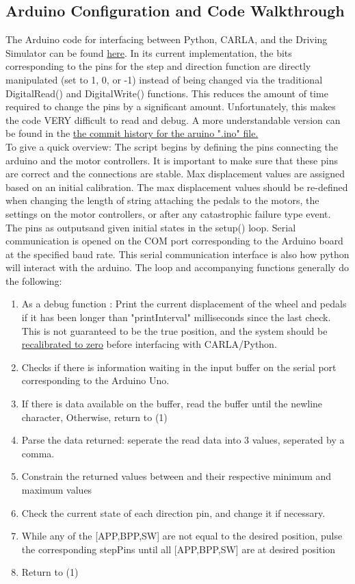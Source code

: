 \documentclass{article}
\begin{document}
\subsection{Arduino Configuration and Code Walkthrough}
The Arduino code for interfacing between Python, CARLA, and the Driving Simulator can be found \href{https://github.com/hrwhite21/DriverlessDIL/blob/main/PythonToMotor/PythonToMotor.ino}{here}. In its current implementation, the bits corresponding to the pins for the step and direction function are directly manipulated (set to 1, 0, or -1) instead of being changed via the traditional DigitalRead() and DigitalWrite() functions. This reduces the amount of time required to change the pins by a significant amount. Unfortunately, this makes the code VERY difficult to read and debug. A more understandable version can be found in the \href{https://tinyurl.com/2s4kpnuv}{the commit history for the aruino ".ino" file.}
\\
To give a quick overview: The script begins by defining the pins connecting the arduino and the motor controllers. It is important to make sure that these pins are correct and the connections are stable. Max displacement values are assigned based on an initial calibration. The max displacement values should be re-defined when changing the length of string attaching the pedals to the motors, the settings on the motor controllers, or after any catastrophic failure type event. The pins as outputsand given initial states in the setup() loop. Serial communication is opened on the COM port corresponding to the Arduino board at the specified baud rate. This serial communication interface is also how python will interact with the arduino. The loop and accompanying functions generally do the following: 
\begin{enumerate}
\item As a debug function : Print the current displacement of the wheel and pedals if it has been longer than "printInterval" milliseconds since the last check. This is not guaranteed to be the true position, and the system should be \hyperref[sec:Calibration]{recalibrated to zero} before interfacing with CARLA/Python.
\item Checks if there is information waiting in the input buffer on the serial port corresponding to the Arduino Uno. 
\item If there is data available on the buffer, read the buffer until the newline character, Otherwise, return to (1)
\item Parse the data returned: seperate the read data into 3 values, seperated by a comma.
\item Constrain the returned values between and their respective minimum and maximum values
\item Check the current state of each direction pin, and change it if necessary.
\item While any of the [APP,BPP,SW] are not equal to the desired position, pulse the corresponding stepPins until all [APP,BPP,SW] are at desired position
\item Return to (1) 
\end{enumerate}
\end{document}

